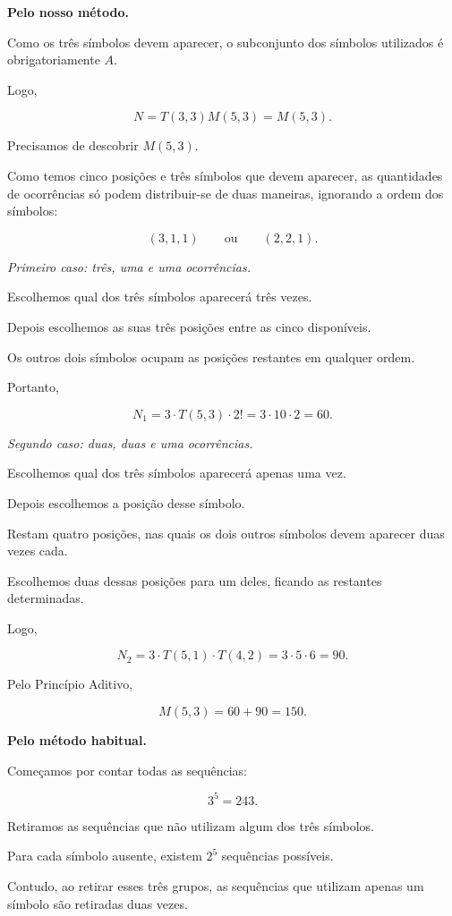 \documentclass[11pt,a4paper,oneside]{book}
\begin{document}
\textbf{Pelo nosso método.}

Como os três símbolos devem aparecer,
o subconjunto dos símbolos utilizados
é obrigatoriamente $A$.

Logo,

\[
N=T(3,3)M(5,3)=M(5,3).
\]

Precisamos de descobrir $M(5,3)$.

Como temos cinco posições e três símbolos
que devem aparecer, as quantidades de
ocorrências só podem distribuir-se
de duas maneiras, ignorando a ordem
dos símbolos:

\[
(3,1,1)
\qquad\text{ou}\qquad
(2,2,1).
\]

\emph{Primeiro caso: três, uma e uma ocorrências.}

Escolhemos qual dos três símbolos
aparecerá três vezes.

Depois escolhemos as suas três posições
entre as cinco disponíveis.

Os outros dois símbolos ocupam
as posições restantes em qualquer ordem.

Portanto,

\[
N_1=3\cdot T(5,3)\cdot2!
   =3\cdot10\cdot2
   =60.
\]

\emph{Segundo caso: duas, duas e uma ocorrências.}

Escolhemos qual dos três símbolos
aparecerá apenas uma vez.

Depois escolhemos a posição desse símbolo.

Restam quatro posições, nas quais
os dois outros símbolos devem aparecer
duas vezes cada.

Escolhemos duas dessas posições
para um deles, ficando as restantes
determinadas.

Logo,

\[
N_2=3\cdot T(5,1)\cdot T(4,2)
   =3\cdot5\cdot6
   =90.
\]

Pelo Princípio Aditivo,

\[
M(5,3)=60+90=\boxed{150}.
\]

\textbf{Pelo método habitual.}

Começamos por contar todas as sequências:

\[
3^5=243.
\]

Retiramos as sequências que não utilizam
algum dos três símbolos.

Para cada símbolo ausente, existem $2^5$
sequências possíveis.

Contudo, ao retirar esses três grupos,
as sequências que utilizam apenas um
símbolo são retiradas duas vezes.
\end{document}
